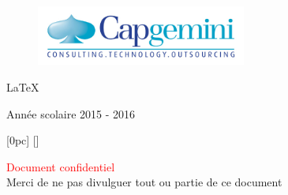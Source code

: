 \documentclass[twoside, 12pt]{report}
\begin{document}
\begin{titlepage}
\begin{sffamily}
\begin{center}
			\vfill
			
			\begin{figure}[h]
				\begin{minipage}{1\textwidth}
					\centering
					\includegraphics[width=6.9cm]{img/capgemini.jpg}
				\end{minipage}%
			\end{figure}
			 
			\LaTeX

			\vfill
			{\large Année scolaire 2015 - 2016}
		\end{center}
	\end{sffamily}
\end{titlepage}

\vfill

\thispagestyle{empty}
\cleardoublepage
\thispagestyle{empty}


%

%

\clearpage
\thispagestyle{empty}
\setcounter{tocdepth}{2}


\tableofcontents
\thispagestyle{empty}

	[0pc] %
	{}%
	{\textsc{\textbf{ \thecontentslabel}} \large}%
	{\textsc{\textbf{ \thecontentslabel}} \large} %
	{\dotfill \contentspage}%
	[\addvspace{.0001pc}]%
\thispagestyle{empty}

\vfill
{\centering
    {\huge \textcolor{red}{Document confidentiel}}\\
    Merci de ne pas divulguer tout ou partie de ce document\\
}
\vfill
\end{document}
